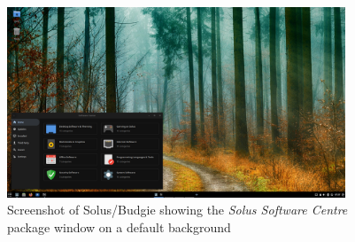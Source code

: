 %

\begin{figure}[!h]
  \centering
   \includegraphics[width=0.9\textwidth]{solusbudgiescreen.png}
  \caption{Screenshot of Solus/Budgie  showing the {\em Solus Software Centre} package window on a default background}
  \label{fig:solusbudgie}
\end{figure}

%

